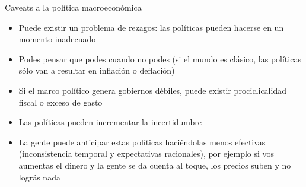 \documentclass{beamer}
\begin{document}
\begin{frame}{Caveats a la política macroeconómica}

    \begin{itemize}
    \item Puede existir un problema de rezagos: las políticas pueden hacerse en un momento inadecuado
    \item Podes pensar que podes cuando no podes (si el mundo es clásico, las políticas sólo van a resultar en inflación o deflación)
    \item Si el marco político genera gobiernos débiles, puede existir prociclicalidad fiscal o exceso de gasto
    \item Las políticas pueden incrementar la incertidumbre
    \item La gente puede anticipar estas políticas haciéndolas menos efectivas (inconsistencia temporal y expectativas racionales), por ejemplo si vos aumentas el dinero y la gente se da cuenta al toque, los precios suben y no lográs nada
    \end{itemize}

\end{frame}



\end{document}
